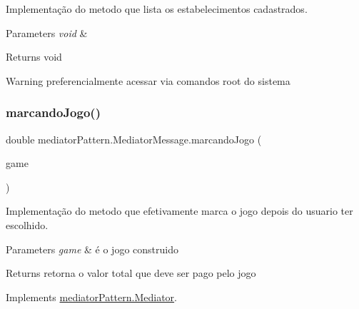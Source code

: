 Implementação do metodo que lista os estabelecimentos cadastrados. 


\begin{DoxyParams}{Parameters}
{\em void} & \\
\hline
\end{DoxyParams}
\begin{DoxyReturn}{Returns}
void 
\end{DoxyReturn}
\begin{DoxyWarning}{Warning}
preferencialmente acessar via comandos root do sistema 
\end{DoxyWarning}
\mbox{\label{classmediator_pattern_1_1_mediator_message_a59667d8a26b4ead1cc624acfb1dc1100}} 
\subsubsection{\texorpdfstring{marcandoJogo()}{marcandoJogo()}}
{\footnotesize\ttfamily double mediator\+Pattern.\+Mediator\+Message.\+marcando\+Jogo (\begin{DoxyParamCaption}\item[{\mbox{\hyperlink{classtemplate_pattern_1_1soccer_game}{soccer\+Game}}}]{game }\end{DoxyParamCaption})}



Implementação do metodo que efetivamente marca o jogo depois do usuario ter escolhido. 


\begin{DoxyParams}{Parameters}
{\em game} & é o jogo construido \\
\hline
\end{DoxyParams}
\begin{DoxyReturn}{Returns}
retorna o valor total que deve ser pago pelo jogo 
\end{DoxyReturn}


Implements \mbox{\hyperlink{interfacemediator_pattern_1_1_mediator_a93da9c7e1478883a0655796d88b7ee62}{mediator\+Pattern.\+Mediator}}.

\mbox{\label{classmediator_pattern_1_1_mediator_message_a5371ff6847a4c3842737c89dbb891cbe}} 
